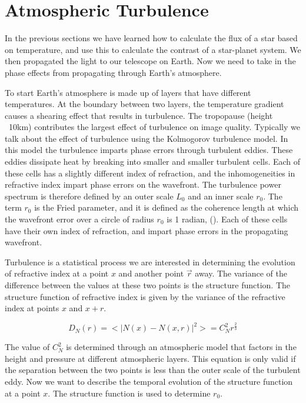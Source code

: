 \section{Atmospheric Turbulence}
In the previous sections we have learned how to calculate the flux of a star based on temperature, and use this to calculate the contrast of a star-planet system. We then propagated the light to our telescope on Earth. Now we need to take in the phase effects from propagating through Earth’s atmosphere. 

To start Earth’s atmosphere is made up of layers that have different temperatures. At the boundary between two layers, the temperature gradient causes a shearing effect that results in turbulence. The tropopause (height ~10km) contributes the largest effect of turbulence on image quality. Typically we talk about the effect of turbulence using the Kolmogorov turbulence model. In this model the turbulence imparts phase errors through turbulent eddies. These eddies dissipate heat by breaking into smaller and smaller turbulent cells. Each of these cells has a slightly different index of refraction, and the inhomogeneities in refractive index impart phase errors on the wavefront. The turbulence power spectrum is therefore defined by an outer scale $L_0$ and an inner scale $r_0$. The term $r_0$ is the Fried parameter, and it is defined as the coherence length at which the wavefront error over a circle of radius $r_0$ is 1 radian, (\cite{roddier1999adaptive}).  Each of these cells have their own index of refraction, and impart phase errors in the propagating wavefront. 

Turbulence is a statistical process we are interested in determining the evolution of refractive index at a point $x$ and another point $\Vec{r}$ away. The variance of the difference between the values at these two points is the structure function. The structure function of refractive index is given by the variance of the refractive index at points $x$ and $x+r$. 

\begin{equation}
    D_N(r)=<|N(x)-N(x,r)|^2>=C_N^2r^{\frac{2}{3}}
\end{equation}

The value of $C_N^2$ is determined through an atmospheric model that factors in the height and pressure at different atmospheric layers. This equation is only valid if the separation between the two points is less than the outer scale of the turbulent eddy.  Now we want to describe the temporal evolution of the structure function at a point $x$. The structure function is used to determine $r_0$.

